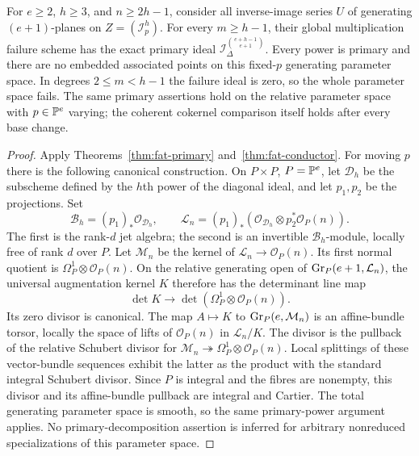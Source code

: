 \begin{corollary}
\label{cor:global-fat-primary}
For $e\ge2$, $h\ge3$, and $n\ge2h-1$, consider all inverse-image
series $U$ of generating $(e+1)$-planes on $Z=(\mathcal I_p^h)$.
For every $m\ge h-1$, their global multiplication failure scheme
has the exact primary ideal $\mathcal I_\Delta^{\binom{e+h-1}{e+1}}$.
Every power is primary and there are no embedded associated points
on this fixed-$p$ generating parameter space. In degrees $2\le m<h-1$
the failure ideal is zero, so the whole parameter space fails.
The same primary assertions hold on the
relative parameter space with $p\in\mathbb P^e$ varying; the coherent
cokernel comparison itself holds after every base change.
\end{corollary}
\begin{proof}
Apply Theorems~\ref{thm:fat-primary} and~\ref{thm:fat-conductor}.
For moving $p$ there is the following canonical construction.
On $P\times P$, $P=\mathbb P^e$, let $\mathcal D_h$ be the subscheme
defined by the $h$th power of the diagonal ideal, and let $p_1,p_2$
be the projections. Set
\[
 \mathcal B_h=(p_1)_*\mathcal O_{\mathcal D_h},\qquad
 \mathcal L_n=(p_1)_*
       (\mathcal O_{\mathcal D_h}\otimes p_2^*\mathcal O_P(n)).
\]
The first is the rank-$d$ jet algebra; the second is an invertible
$\mathcal B_h$-module, locally free of rank $d$ over $P$.
Let $\mathcal M_n$ be the kernel of
$\mathcal L_n\to\mathcal O_P(n)$. Its first normal quotient is
$\Omega_P^1\otimes\mathcal O_P(n)$. On the relative generating open
of $\operatorname{Gr}_P(e+1,\mathcal L_n)$, the universal augmentation kernel
$K$ therefore has the determinant line map
\[
 \det K\longrightarrow
 \det(\Omega_P^1\otimes\mathcal O_P(n)).
\]
Its zero divisor is canonical. The map $A\mapsto K$ to
$\operatorname{Gr}_P(e,\mathcal M_n)$ is an affine-bundle torsor, locally the
space of lifts of $\mathcal O_P(n)$ in $\mathcal L_n/K$.
The divisor is the pullback of the relative Schubert divisor for
$\mathcal M_n\twoheadrightarrow\Omega_P^1\otimes\mathcal O_P(n)$.
Local splittings of these vector-bundle sequences exhibit the latter
as the product with the standard integral Schubert divisor. Since
$P$ is integral and the fibres are nonempty, this divisor and its
affine-bundle pullback are integral and Cartier. The total generating
parameter space is smooth, so the same primary-power argument applies.
No primary-decomposition assertion is inferred
for arbitrary nonreduced specializations of this parameter space.
\end{proof}
